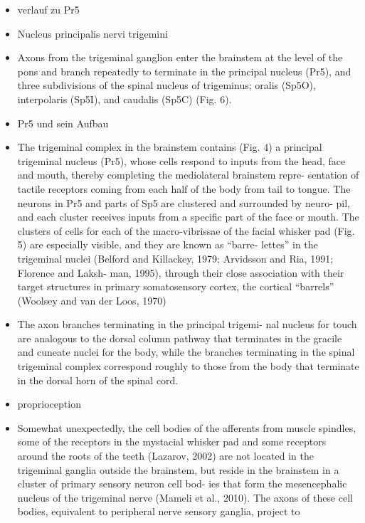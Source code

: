 \documentclass[12pt,a4paper,pdftex]{article}
\begin{document}
\begin{itemize}
\item verlauf zu Pr5
\item Nucleus principalis nervi trigemini
\item Axons from the trigeminal ganglion enter the brainstem
at the level of the pons and branch repeatedly to terminate
in the principal nucleus (Pr5), and three subdivisions of the
spinal nucleus of trigeminus; oralis (Sp5O), interpolaris
(Sp5I), and caudalis (Sp5C) (Fig. 6).
\\
\item Pr5 und sein Aufbau
\item The trigeminal complex in the brainstem contains
(Fig. 4) a principal trigeminal nucleus (Pr5), whose
cells respond to inputs from the head, face and mouth,
thereby completing the mediolateral brainstem repre-
sentation of tactile receptors coming from each half of
the body from tail to tongue. The neurons in Pr5 and
parts of Sp5 are clustered and surrounded by neuro-
pil, and each cluster receives inputs from a specific part
of the face or mouth. The clusters of cells for each of
the macro-vibrissae of the facial whisker pad (Fig. 5)
are especially visible, and they are known as “barre-
lettes” in the trigeminal nuclei (Belford and Killackey,
1979; Arvidsson and Ria, 1991; Florence and Laksh-
man, 1995), through their close association with their
target structures in primary somatosensory cortex, the
cortical “barrels” (Woolsey and van der Loos, 1970)
\\
\item The axon branches terminating in the principal trigemi-
nal nucleus for touch are analogous to the dorsal column
pathway that terminates in the gracile and cuneate nuclei
for the body, while the branches terminating in the spinal
trigeminal complex correspond roughly to those from the
body that terminate in the dorsal horn of the spinal cord.
\\
\item proprioception
\item Somewhat unexpectedly, the cell bodies of
the afferents from muscle spindles, some of the receptors
in the mystacial whisker pad and some receptors around
the roots of the teeth (Lazarov, 2002) are not located in the
trigeminal ganglia outside the brainstem, but reside in the
brainstem in a cluster of primary sensory neuron cell bod-
ies that form the mesencephalic nucleus of the trigeminal
nerve (Mameli et al., 2010). The axons of these cell bodies,
equivalent to peripheral nerve sensory ganglia, project to

\end{itemize}
\end{document}
